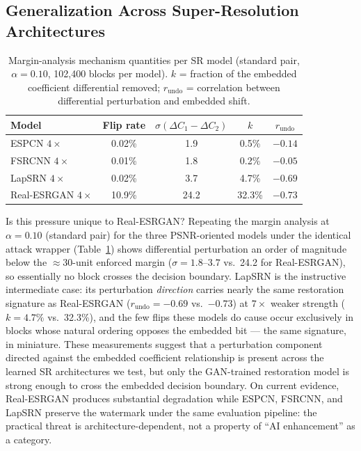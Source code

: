 \documentclass[conference]{IEEEtran}
\begin{document}
\subsection{Generalization Across Super-Resolution Architectures}
\label{sec:generalization}

\begin{table}[t]
\caption{Margin-analysis mechanism quantities per SR model (standard
pair, $\alpha=0.10$, 102,400 blocks per model). $k$ = fraction of the
embedded coefficient differential removed; $r_{\mathrm{undo}}$ =
correlation between differential perturbation and embedded shift.}
\label{tab:mechanism}
\centering
\begin{tabular}{lcccc}
\toprule
Model & Flip rate & $\sigma(\Delta C_1{-}\Delta C_2)$ & $k$ & $r_{\mathrm{undo}}$ \\
\midrule
ESPCN $4\times$       & 0.02\% & 1.9  & 0.5\%  & $-0.14$ \\
FSRCNN $4\times$      & 0.01\% & 1.8  & 0.2\%  & $-0.05$ \\
LapSRN $4\times$      & 0.02\% & 3.7  & 4.7\%  & $-0.69$ \\
Real-ESRGAN $4\times$ & 10.9\% & 24.2 & 32.3\% & $-0.73$ \\
\bottomrule
\end{tabular}
\end{table}

Is this pressure unique to Real-ESRGAN? Repeating the margin analysis
at $\alpha = 0.10$ (standard pair) for the three PSNR-oriented models
under the identical attack wrapper (Table~\ref{tab:mechanism}) shows
differential perturbation an order of magnitude below the
$\approx$30-unit enforced margin ($\sigma = 1.8$--$3.7$ vs.\ 24.2 for
Real-ESRGAN), so essentially no block crosses the decision boundary.
LapSRN is the instructive intermediate case: its perturbation
\emph{direction} carries nearly the same restoration signature as
Real-ESRGAN ($r_{\mathrm{undo}} = -0.69$ vs.\ $-0.73$) at $7\times$
weaker strength ($k = 4.7\%$ vs.\ 32.3\%), and the few flips these
models do cause occur exclusively in blocks whose natural ordering
opposes the embedded bit --- the same signature, in miniature. These
measurements suggest that a perturbation component directed against
the embedded coefficient relationship is present across the learned SR
architectures we test, but only the GAN-trained restoration model is
strong enough to cross the embedded decision boundary. On current
evidence, Real-ESRGAN produces substantial degradation while ESPCN,
FSRCNN, and LapSRN preserve the watermark under the same evaluation
pipeline: the practical threat is architecture-dependent, not a
property of ``AI enhancement'' as a category.
\end{document}
